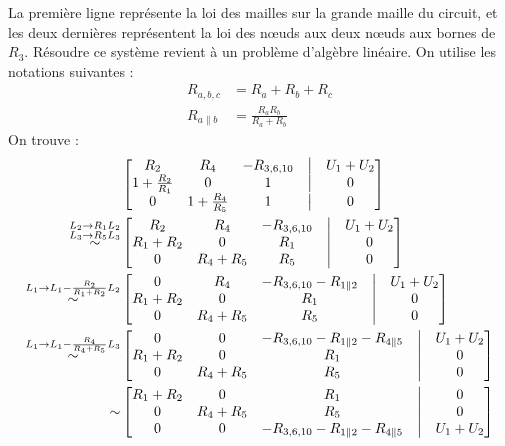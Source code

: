 \documentclass{article}
\newcommand{\R}{\mathbb{R}}
\begin{document}
La première ligne représente la loi des mailles sur la grande maille du circuit, et les deux dernières représentent la loi des n\oe{}uds aux deux n\oe{}uds aux bornes de $R_3$. Résoudre ce système revient à un problème d'algèbre linéaire. On utilise les notations suivantes :
\[
\begin{aligned}R_{a,b,c} &= R_a + R_b + R_c\\R_{a\parallel b} &= \frac{R_a R_b}{R_a + R_b}
\end{aligned}\] On trouve : \begin{align*}
&\begin{bmatrix}
    R_2 & R_4 & -R_{3,6,10} & \bigm| & U_1+U_2\\
    1 + \frac{R_2}{R_1} & 0 & 1 & \bigm| & 0\\
    0 & 1 + \frac{R_4}{R_5} & 1 & \bigm| & 0
\end{bmatrix}\\
\overset{\substack{L_2 \rightarrow R_1 L_2 \\ L_3 \rightarrow R_5 L_3}}{\sim}
&\begin{bmatrix}
    R_2 & R_4 & -R_{3,6,10} & \bigm| & U_1+U_2\\
    R_1 + R_2 & 0 & R_1 & \bigm| & 0\\
    0 & R_4 + R_5 & R_5 & \bigm| & 0
\end{bmatrix}\\
\overset{L_1 \rightarrow L_1 - \frac{R_2}{R_1+R_2} L_2}{\sim}
&\begin{bmatrix}
    0 & R_4 & -R_{3,6,10} - R_{1\parallel 2} & \bigm| & U_1+U_2\\
    R_1 + R_2 & 0 & R_1 & \bigm| & 0\\
    0 & R_4 + R_5 & R_5 & \bigm| & 0
\end{bmatrix}\\
\overset{L_1 \rightarrow L_1 - \frac{R_4}{R_4+R_5} L_3}{\sim}
&\begin{bmatrix}
    0 & 0 & -R_{3,6,10} - R_{1\parallel 2} - R_{4\parallel 5} & \bigm| & U_1+U_2\\
    R_1 + R_2 & 0 & R_1 & \bigm| & 0\\
    0 & R_4 + R_5 & R_5 & \bigm| & 0
\end{bmatrix} \\%
\sim
&\begin{bmatrix}
    R_1 + R_2 & 0 & R_1 & \bigm| & 0\\
    0 & R_4 + R_5 & R_5 & \bigm| & 0 \\
    0 & 0 & -R_{3,6,10} - R_{1\parallel 2} - R_{4\parallel 5} & \bigm| & U_1+U_2\\

\end{bmatrix}
\end{align*}
\end{document}
